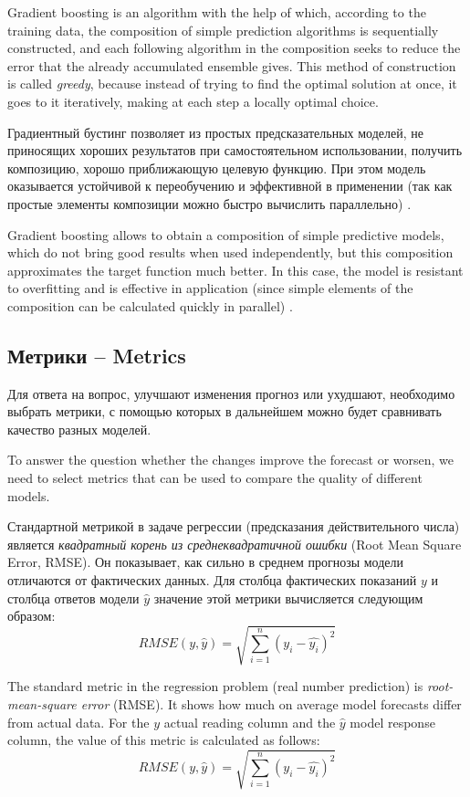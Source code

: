 \documentclass[14pt]{matmex-diploma}
\begin{document}
Gradient boosting is an algorithm with the help of which, according to the training data, the composition of simple prediction algorithms is sequentially constructed, and each following algorithm in the composition seeks to reduce the error that the already accumulated ensemble gives. This method of construction is called \textit{greedy}, because instead of trying to find the optimal solution at once, it goes to it iteratively, making at each step a locally optimal choice\cite{friedman2001greedy}.

Градиентный бустинг позволяет из простых предсказательных моделей, не приносящих хороших результатов при самостоятельном использовании, получить композицию, хорошо приближающую целевую функцию. При этом модель оказывается устойчивой к переобучению и эффективной в применении (так как простые элементы композиции можно быстро вычислить параллельно) \cite{FRIEDMAN2002367}.

Gradient boosting allows to obtain a composition of simple predictive models, which do not bring good results when used independently, but this composition approximates the target function much better. In this case, the model is resistant to overfitting and is effective in application (since simple elements of the composition can be calculated quickly in parallel) \cite{FRIEDMAN2002367}.



\subsection{Метрики -- Metrics}
Для ответа на вопрос, улучшают изменения прогноз или ухудшают, необходимо выбрать метрики, с помощью которых в дальнейшем можно будет сравнивать качество разных моделей.

To answer the question whether the changes improve the forecast or worsen, we need to select metrics that can be used to compare the quality of different models.

Стандартной метрикой в задаче регрессии (предсказания действительного числа) является \textit{квадратный корень из среднеквадратичной ошибки} (Root Mean Square Error, RMSE). Он показывает, как сильно в среднем прогнозы модели отличаются от фактических данных. Для столбца фактических показаний $y$ и столбца ответов модели $\hat{y}$ значение этой метрики вычисляется следующим образом:
        $$RMSE(y, \hat{y}) = \sqrt{\sum^{n}_{i=1}{(y_i - \hat{y_i})^2}}$$

The standard metric in the regression problem (real number prediction) is \textit{root-mean-square error} (RMSE). It shows how much on average model forecasts differ from actual data. For the $y$ actual reading column and the $\hat{y}$ model response column, the value of this metric is calculated as follows:
        $$RMSE (y, \hat{y}) = \sqrt{\sum^{n}_{i=1}{(y_i - \hat{y_i})^2}}$$
\end{document}
